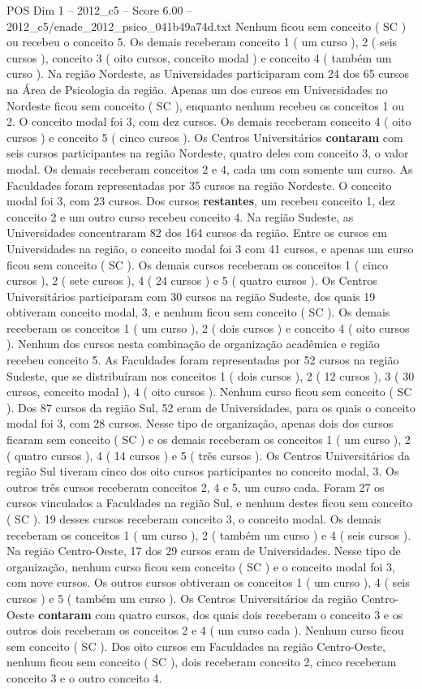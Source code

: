 \begin{textsample}{POS Dim 1 – 2012\_c5 – Score 6.00 – 2012\_c5/enade\_2012\_psico\_041b49a74d.txt}
Nenhum ficou sem conceito ( SC ) ou recebeu o conceito 5.
Os demais receberam conceito 1 ( um curso ), 2 ( seis cursos ), conceito 3 ( oito cursos, conceito modal ) e conceito 4 ( também um curso ).
Na região Nordeste, as Universidades participaram com 24 dos 65 cursos na Área de Psicologia da região.
Apenas um dos cursos em Universidades no Nordeste ficou sem conceito ( SC ), enquanto nenhum recebeu os conceitos 1 ou 2.
O conceito modal foi 3, com dez cursos.
Os demais receberam conceito 4 ( oito cursos ) e conceito 5 ( cinco cursos ).
Os Centros Universitários \textbf{contaram} com seis cursos participantes na região Nordeste, quatro deles com conceito 3, o valor modal.
Os demais receberam conceitos 2 e 4, cada um com somente um curso.
As Faculdades foram representadas por 35 cursos na região Nordeste.
O conceito modal foi 3, com 23 cursos.
Dos cursos \textbf{restantes}, um recebeu conceito 1, dez conceito 2 e um outro curso recebeu conceito 4.
Na região Sudeste, as Universidades concentraram 82 dos 164 cursos da região.
Entre os cursos em Universidades na região, o conceito modal foi 3 com 41 cursos, e apenas um curso ficou sem conceito ( SC ).
Os demais cursos receberam os conceitos 1 ( cinco cursos ), 2 ( sete cursos ), 4 ( 24 cursos ) e 5 ( quatro cursos ).
Os Centros Universitários participaram com 30 cursos na região Sudeste, dos quais 19 obtiveram conceito modal, 3, e nenhum ficou sem conceito ( SC ).
Os demais receberam os conceitos 1 ( um curso ), 2 ( dois cursos ) e conceito 4 ( oito cursos ).
Nenhum dos cursos nesta combinação de organização acadêmica e região recebeu conceito 5.
As Faculdades foram representadas por 52 cursos na região Sudeste, que se distribuíram nos conceitos 1 ( dois cursos ), 2 ( 12 cursos ), 3 ( 30 cursos, conceito modal ), 4 ( oito cursos ).
Nenhum curso ficou sem conceito ( SC ).
Dos 87 cursos da região Sul, 52 eram de Universidades, para os quais o conceito modal foi 3, com 28 cursos.
Nesse tipo de organização, apenas dois dos cursos ficaram sem conceito ( SC ) e os demais receberam os conceitos 1 ( um curso ), 2 ( quatro cursos ), 4 ( 14 cursos ) e 5 ( três cursos ).
Os Centros Universitários da região Sul tiveram cinco dos oito cursos participantes no conceito modal, 3.
Os outros três cursos receberam conceitos 2, 4 e 5, um curso cada.
Foram 27 os cursos vinculados a Faculdades na região Sul, e nenhum destes ficou sem conceito ( SC ). 19 desses cursos receberam conceito 3, o conceito modal.
Os demais receberam os conceitos 1 ( um curso ), 2 ( também um curso ) e 4 ( seis cursos ).
Na região Centro-Oeste, 17 dos 29 cursos eram de Universidades.
Nesse tipo de organização, nenhum curso ficou sem conceito ( SC ) e o conceito modal foi 3, com nove cursos.
Os outros cursos obtiveram os conceitos 1 ( um curso ), 4 ( seis cursos ) e 5 ( também um curso ).
Os Centros Universitários da região Centro-Oeste \textbf{contaram} com quatro cursos, dos quais dois receberam o conceito 3 e os outros dois receberam os conceitos 2 e 4 ( um curso cada ).
Nenhum curso ficou sem conceito ( SC ).
Dos oito cursos em Faculdades na região Centro-Oeste, nenhum ficou sem conceito ( SC ), dois receberam conceito 2, cinco receberam conceito 3 e o outro conceito 4.


\end{textsample}
